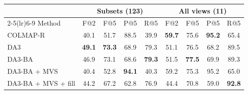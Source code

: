 \begin{tabular}{l cccc cccc}
\toprule
 & \multicolumn{4}{c}{Subsets (123)} & \multicolumn{4}{c}{All views (11)} \\
\cmidrule(lr){2-5}\cmidrule(lr){6-9}
Method & F@2 & F@5 & P@5 & R@5 & F@2 & F@5 & P@5 & R@5 \\
\midrule
COLMAP-R & 40.1 & 51.7 & 88.5 & 39.9 & \textbf{59.7} & 75.6 & \textbf{95.2} & 65.4 \\
DA3 & \textbf{49.1} & \textbf{73.3} & 68.9 & 79.3 & 51.1 & 76.5 & 68.2 & 89.5 \\
DA3-BA & 46.9 & 73.1 & 68.6 & \textbf{79.3} & 51.5 & \textbf{77.5} & 69.9 & 89.3 \\
DA3-BA + MVS & 40.4 & 52.8 & \textbf{94.1} & 40.3 & 59.2 & 75.3 & 95.2 & 65.0 \\
DA3-BA + MVS + fill & 44.2 & 67.2 & 62.8 & 76.9 & 44.4 & 70.8 & 59.0 & \textbf{92.8} \\
\bottomrule
\end{tabular}
